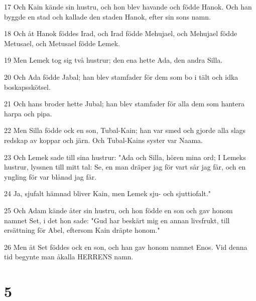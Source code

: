 \par 17 Och Kain kände sin hustru, och hon blev havande och födde Hanok. Och han byggde en stad och kallade den staden Hanok, efter sin sons namn.
\par 18 Och åt Hanok föddes Irad, och Irad födde Mehujael, och Mehujael födde Metusael, och Metusael födde Lemek.
\par 19 Men Lemek tog sig två hustrur; den ena hette Ada, den andra Silla.
\par 20 Och Ada födde Jabal; han blev stamfader för dem som bo i tält och idka boskapsskötsel.
\par 21 Och hans broder hette Jubal; han blev stamfader för alla dem som hantera harpa och pipa.
\par 22 Men Silla födde ock en son, Tubal-Kain; han var smed och gjorde alla slags redskap av koppar och järn. Och Tubal-Kains syster var Naama.
\par 23 Och Lemek sade till sina hustrur: "Ada och Silla, hören mina ord; I Lemeks hustrur, lyssnen till mitt tal: Se, en man dräper jag för vart sår jag får, och en yngling för var blånad jag får.
\par 24 Ja, sjufalt hämnad bliver Kain, men Lemek sju- och sjuttiofalt."
\par 25 Och Adam kände åter sin hustru, och hon födde en son och gav honom namnet Set, i det hon sade: "Gud har beskärt mig en annan livsfrukt, till ersättning för Abel, eftersom Kain dräpte honom."
\par 26 Men åt Set föddes ock en son, och han gav honom namnet Enos. Vid denna tid begynte man åkalla HERRENS namn.

\chapter{5}

